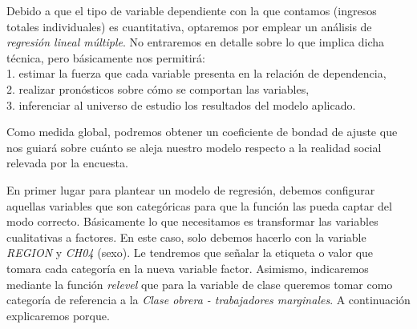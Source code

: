 \documentclass[
]{article}
\newenvironment{Shaded}{\begin{snugshade}}{\end{snugshade}}
\newcommand{\AttributeTok}[1]{\textcolor[rgb]{0.13,0.29,0.53}{#1}}
\newcommand{\FunctionTok}[1]{\textcolor[rgb]{0.13,0.29,0.53}{\textbf{#1}}}
\newcommand{\NormalTok}[1]{#1}
\newcommand{\OtherTok}[1]{\textcolor[rgb]{0.56,0.35,0.01}{#1}}
\newcommand{\SpecialCharTok}[1]{\textcolor[rgb]{0.81,0.36,0.00}{\textbf{#1}}}
\newcommand{\StringTok}[1]{\textcolor[rgb]{0.31,0.60,0.02}{#1}}
\begin{document}
Debido a que el tipo de variable dependiente con la que contamos (ingresos totales individuales) es cuantitativa, optaremos por emplear un análisis de \emph{regresión lineal múltiple}. No entraremos en detalle sobre lo que implica dicha técnica, pero básicamente nos permitirá:\\
1. estimar la fuerza que cada variable presenta en la relación de dependencia,\\
2. realizar pronósticos sobre cómo se comportan las variables,\\
3. inferenciar al universo de estudio los resultados del modelo aplicado.

Como medida global, podremos obtener un coeficiente de bondad de ajuste que nos guiará sobre cuánto se aleja nuestro modelo respecto a la realidad social relevada por la encuesta.

En primer lugar para plantear un modelo de regresión, debemos configurar aquellas variables que son categóricas para que la función las pueda captar del modo correcto. Básicamente lo que necesitamos es transformar las variables cualitativas a factores. En este caso, solo debemos hacerlo con la variable \emph{REGION} y \emph{CH04} (sexo). Le tendremos que señalar la etiqueta o valor que tomara cada categoría en la nueva variable factor. Asimismo, indicaremos mediante la función \emph{relevel} que para la variable de clase queremos tomar como categoría de referencia a la \emph{Clase obrera - trabajadores marginales}. A continuación explicaremos porque.

\begin{Shaded}
\end{Shaded}
\end{document}
